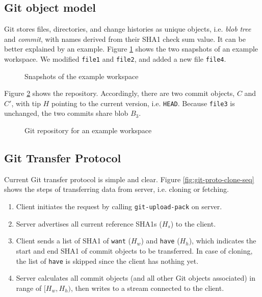 \documentclass[preprint]{sigplanconf}
\begin{document}
\subsection{Git object model}
Git stores files, directories, and change histories as unique objects, i.e.
\emph{blob} \emph{tree} and \emph{commit}, with names derived from their SHA1
check sum value\cite{gitobj}.
It can be better explained by an example.
Figure \ref{fig:workspace} shows the two snapshots of an example workspace.
We modified \verb|file1| and \verb|file2|, and added a new file \verb|file4|.
\begin{figure}[htpb]
  \centering
  
  \caption{Snapshots of the example workspace}
  \label{fig:workspace}
\end{figure}

Figure \ref{fig:git-repo} shows the repository.
Accordingly, there are two commit objects, $C$ and $C'$, with tip $H$ pointing
to the current version, i.e. \verb|HEAD|.
Because \verb|file3| is unchanged, the two commits share blob $B_3$.

\begin{figure}[htpb]
  \centering
  
  \caption{Git repository for an example workspace}
  \label{fig:git-repo}
\end{figure}

\subsection{Git Transfer Protocol}
Current Git transfer protocol is simple and clear\cite{tran-protocol}.
Figure \ref{fig:git-proto-clone-seq} shows the steps of transferring data from
server, i.e. cloning or fetching.

\begin{enumerate}
  \item Client initiates the request by calling \verb|git-upload-pack| on
    server.

  \item Server advertises all current reference SHA1s ($H_s$) to the client.

  \item Client sends a list of SHA1 of \verb|want| ($H_w$) and \verb|have|
    ($H_h$), which indicates the start and end SHA1 of commit objects to be
    transferred.
    In case of cloning, the list of \verb|have| is skipped since the client has
    nothing yet.

  \item Server calculates all commit objects (and all other Git objects
    associated) in range of $[H_w, H_h)$, then writes to a stream connected to
    the client.
\end{enumerate}
\end{document}
